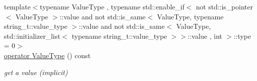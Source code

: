 \begin{DoxyCompactItemize}
{\footnotesize template$<$typename Value\+Type , typename std\+::enable\+\_\+if$<$                                                                      not std\+::is\+\_\+pointer$<$ Value\+Type $>$\+::value and                                                                   not std\+::is\+\_\+same$<$ Value\+Type, typename string\+\_\+t\+::value\+\_\+type $>$\+::value                                                                   and not std\+::is\+\_\+same$<$ Value\+Type, std\+::initializer\+\_\+list$<$ typename string\+\_\+t\+::value\+\_\+type $>$$>$\+::value                                                                   , int $>$\+::type  = 0$>$ }\\\hyperlink{classnlohmann_1_1basic__json_aef496a56163710084e13612ab73e6ed2}{operator Value\+Type} () const 
\begin{DoxyCompactList}\small\item\em get a value (implicit) \end{DoxyCompactList}\end{DoxyCompactItemize}
